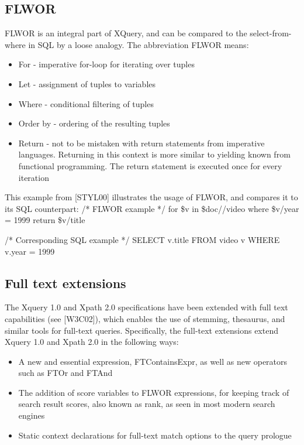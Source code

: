 \subsection{FLWOR}
FLWOR is an integral part of XQuery, and can be compared to the select-from-where in SQL by a loose analogy. The abbreviation FLWOR means:
\begin{itemize}
\item For - imperative for-loop for iterating over tuples
\item Let - assignment of tuples to variables
\item Where - conditional filtering of tuples
\item Order by - ordering of the resulting tuples
\item Return - not to be mistaken with return statements from imperative languages. Returning in this context is more similar to yielding known from functional programming. The return statement is executed once for every iteration
\end{itemize}
This example from [STYL00] illustrates the usage of FLWOR, and compares it to its SQL counterpart:
/* FLWOR example */
for \$v in \$doc//video
where \$v/year = 1999
return \$v/title

/* Corresponding SQL example */
SELECT v.title FROM video v WHERE v.year = 1999

\subsection{Full text extensions}
The Xquery 1.0  and Xpath 2.0 specifications have been extended with full text capabilities (see [W3C02]), which enables the use of stemming, thesaurus, and similar tools for full-text queries. Specifically, the full-text extensions extend Xquery 1.0 and Xpath 2.0 in the following ways:
\begin{itemize}
\item A new and essential expression, FTContainsExpr, as well as new operators such as FTOr and FTAnd
\item The addition of score variables to FLWOR expressions, for keeping track of search result scores, also known as rank, as seen in most modern search engines
\item Static context declarations for full-text match options to the query prologue
\end{itemize}

